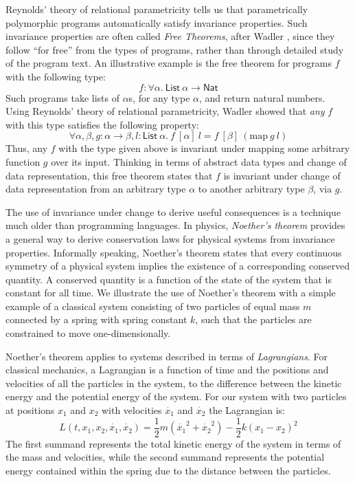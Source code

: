 \documentclass{sigplanconf}
\theoremstyle{examplestyle}
\begin{document}
Reynolds' theory of relational parametricity \cite{reynolds83types}
tells us that parametrically polymorphic programs automatically
satisfy invariance properties. Such invariance properties are often
called \emph{Free Theorems}, after Wadler \cite{wadler89theorems},
since they follow ``for free'' from the types of programs, rather than
through detailed study of the program text. An illustrative example is
the free theorem for programs $f$ with the following type:
\begin{displaymath}
  f : \forall \alpha.~\mathsf{List}~\alpha \to \mathsf{Nat}
\end{displaymath}
Such programs take lists of $\alpha$s, for any type $\alpha$, and
return natural numbers. Using Reynolds' theory of relational
parametricity, Wadler showed that \emph{any} $f$ with this type
satisfies the following property:
\begin{displaymath}
  \forall \alpha, \beta, g : \alpha \to \beta, l : \mathsf{List}~\alpha.~f~[\alpha]~l = f~[\beta]~(\mathrm{map}~g~l)
\end{displaymath}
Thus, any $f$ with the type given above is invariant under mapping
some arbitrary function $g$ over its input. Thinking in terms of
abstract data types and change of data representation, this free
theorem states that $f$ is invariant under change of data
representation from an arbitrary type $\alpha$ to another arbitrary
type $\beta$, via $g$.

The use of invariance under change to derive useful consequences is a
technique much older than programming languages. In physics,
\emph{Noether's theorem} \cite{noether71} provides a general way to
derive conservation laws for physical systems from invariance
properties. Informally speaking, Noether's theorem states that every
continuous symmetry of a physical system implies the existence of a
corresponding conserved quantity. A conserved quantity is a function
of the state of the system that is constant for all time. We
illustrate the use of Noether's theorem with a simple example of a
classical system consisting of two particles of equal mass $m$
connected by a spring with spring constant $k$, such that the
particles are constrained to move one-dimensionally.


Noether's theorem applies to systems described in terms of
\emph{Lagrangians}. For classical mechanics, a Lagrangian is a
function of time and the positions and velocities of all the
particles in the system, to the difference between the kinetic energy
and the potential energy of the system. For our system with two
particles at positions $x_1$ and $x_2$ with velocities $\dot{x_1}$ and
$\dot{x_2}$ the Lagrangian is:
\begin{equation}\label{eq:coupled-spring-lagrangian}
  L(t,x_1,x_2,\dot{x_1},\dot{x_2}) = \frac{1}{2}m(\dot{x_1}^2 + \dot{x_2}^2) - \frac{1}{2}k(x_1 - x_2)^2
\end{equation}
The first summand represents the total kinetic energy of the system in
terms of the mass and velocities, while the second summand represents
the potential energy contained within the spring due to the distance
between the particles.
\end{document}
